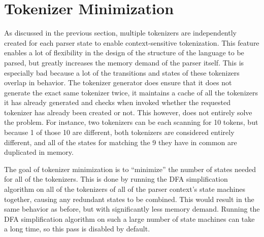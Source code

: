 
\section{Tokenizer Minimization}
{
	As discussed in the previous section,
	multiple tokenizers are independently created for
	each parser state to enable context-sensitive tokenization.
	This feature enables a lot of flexibility in the design of the structure
	of the language to be parsed, but greatly increases the memory demand
	of the parser itself. This is especially bad because a lot
	of the transitions
	and states of these tokenizers overlap in behavior.
	The tokenizer generator does ensure that it does not generate the
	exact same tokenizer twice, it maintains a cache of all the tokenizers
	it has already generated and checks when invoked whether the requested
	tokenizer has already been created or not.
	This however, does not entirely solve the problem.
	For instance, two tokenizers can be each scanning for 10 tokens, but
	because 1 of those 10 are different, both tokenizers are considered
	entirely different, and all of the states for matching the 9 they have
	in common are duplicated in memory.
	
	The goal of tokenizer minimization is to ``minimize'' the number of
	states needed for all of the tokenizers. This is done by running
	the DFA simplification algorithm on all of the tokenizers of all of the
	parser context's state machines together,
	causing any redundant states to be combined. This would result
	in the same behavior as before, but with significantly less memory demand.
	Running the DFA simplification algorithm on such a large number
	of state machines can take a long time, so this pass is disabled by
	default.
}

